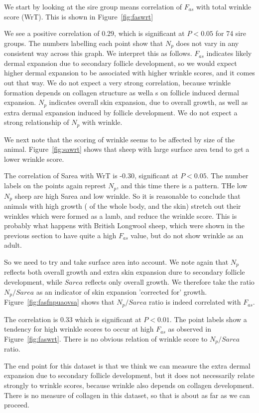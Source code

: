 \documentclass[titlepage]{article}  %
\begin{document}
We start by looking at the sire group means correlation of $F_{as}$ with total wrinkle score (WrT). This is shown in Figure~\ref{fig:faswrt}

We see a positive correlation of 0.29, which is significant at $P<0.05$ for 74 sire groups.  The numbers labelling each point show that $N_{p}$ does not vary in any consistent way across this graph. We interpret this as follows. $F_{as}$ indicates likely dermal expansion due to secondary follicle development, so we would expect higher dermal expansion to be associated with higher wrinkle scores, and it comes out that way. We do not expect a very strong correlation, because wrinkle formation depends on collagen structure as wella s on follicle induced dermal expansion. $N_{p}$ indicates overall skin expansion, due to overall growth, as well as extra dermal expansion induced by follicle development. We do not expect a strong relationship of $N_{p}$ with wrinkle. 

We next note that the scoring of wrinkle seems to be affected by size of the animal. Figure~\ref{fig:sawrt} shows that sheep with large surface area tend to get a lower wrinkle score.

The correlation of Sarea with WrT is -0.30, significant at $P<0.05$. The number labels on the points again represt $N_{p}$, and this time there is a pattern. THe low $N_{p}$ sheep are high Sarea and low wrinkle. So it is reasonable to conclude that animals with high growth ( of the whole body, and the skin) stretch out their wrinkles which were formed as a lamb, and reduce the wrinkle score. This is probably what happens with British Longwool sheep, which were shown in the previous section to have quite a high $F_{as}$ value, but do not show wrinkle as an adult.

So we need to try and take surface area into account. We note again that $N_{p}$ reflects both overall growth and extra skin expansion dure to secondary follicle development, while $Sarea$  reflects only overall growth. We therefore take the ratio $N_{p}/Sarea$ as an indicator of skin expansion 'corrected for' growth.  Figure~\ref{fig:fasfnpuaovsa} shows that $N_{p}/Sarea$ ratio is indeed correlated with $F_{as}$.

The correlation is 0.33 which is significant at $P<0.01$.  The point labels show a tendency for high wrinkle scores to occur at high $F_{as}$ as observed in Figure~\ref{fig:faswrt}. There is no obvious relation of wrinkle score to $N_{p}/Sarea$ ratio. 

The end point for this dataset is that we think we can measure the extra dermal expansion due to secondary follicle development, but it does not necessarily relate strongly to wrinkle scores, because wrinkle also depends on collagen development. There is no measure of collagen in this dataset, so that is about as far as we can proceed.
\end{document}
